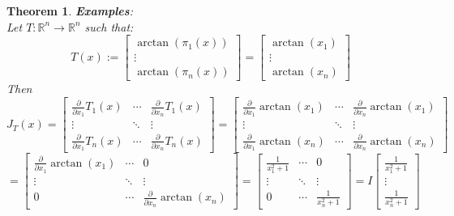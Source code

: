 \documentclass[12pt]{extarticle}
\theoremstyle{plain}
\newtheorem{thm}{Theorem}[section]
\theoremstyle{Definition}
\theoremstyle{Definition}
\theoremstyle{plain}
\begin{document}
\begin{thm} \textbf{Examples}: \\ 
	Let $T : \mathbb{R}^n \to \mathbb{R}^n$ such that:
	\[
	T(x) := 
	\begin{bmatrix}
	\arctan(\pi_1(x)) \\ 
	\vdots \\ 
	\arctan(\pi_n(x))
	\end{bmatrix}
	= 
	\begin{bmatrix}
	\arctan(x_1) \\ 
	\vdots \\ 
	\arctan(x_n)
	\end{bmatrix}
	\]
	Then
	\[
	J_T(x) = 
	\begin{bmatrix} 
	\frac{\partial }{\partial x_1}T_1(x) & \cdots & \frac{\partial }{\partial x_n}T_1(x) \\
	\vdots & \ddots & \vdots \\ 
	\frac{\partial }{\partial x_1}T_n(x) & \cdots & \frac{\partial }{\partial x_n}T_n(x) 
	\end{bmatrix}
	=
	\begin{bmatrix} 
	\frac{\partial}{\partial x_1}\arctan(x_1) & \cdots & \frac{\partial}{\partial x_n}\arctan(x_1) \\
	\vdots & \ddots & \vdots \\ 
	\frac{\partial }{\partial x_1}\arctan(x_n) & \cdots & \frac{\partial }{\partial x_n}\arctan(x_n) 
	\end{bmatrix}	
	\]
	\[
	=
	\begin{bmatrix} 
	\frac{\partial}{\partial x_1}\arctan(x_1) & \cdots & 0 \\
	\vdots & \ddots & \vdots \\ 
	0 & \cdots & \frac{\partial }{\partial x_n}\arctan(x_n) 
	\end{bmatrix}								
	=
	\begin{bmatrix} 
	\frac{1}{x_1^2 + 1} & \cdots & 0 \\
	\vdots & \ddots & \vdots \\ 
	0 & \cdots & \frac{1}{x_n^2 + 1} 
	\end{bmatrix}								
	= I \begin{bmatrix}
		\frac{1}{x_1^2 + 1} \\ 
		\vdots \\
			\frac{1}{x_n^2 + 1}
	\end{bmatrix}
	\]
\end{thm}
\end{document}
